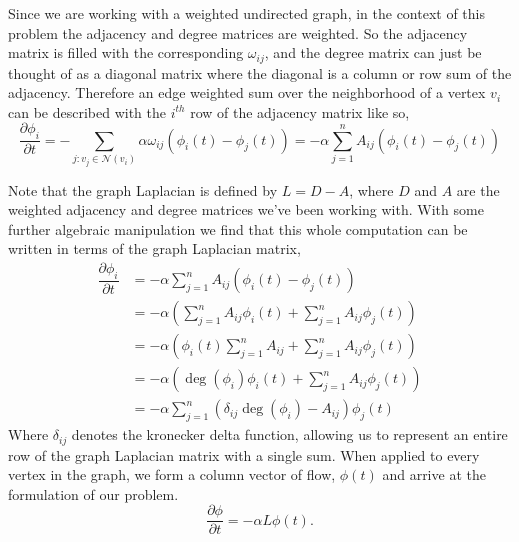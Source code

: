 \documentclass[11pt]{article}
\begin{document}
Since we are working with a weighted undirected graph, in the context of this problem the adjacency and degree matrices are weighted. So the adjacency matrix
is filled with the corresponding $\omega_{ij}$, and the degree matrix can just be thought of as a diagonal matrix where the diagonal is a column or row sum of the adjacency.  
Therefore an edge weighted sum over the neighborhood of a vertex $v_i$ can be described with the $i^{th}$ row of the adjacency matrix like so, 
\begin{equation*}
    \dfrac{\partial \phi_{i}}{\partial t} = -\sum_{j: v_j \in \mathcal{N}(v_i)} \alpha \omega_{ij}(\phi_i(t) - \phi_j(t)) =  -\alpha \sum_{j = 1}^n A_{ij}(\phi_i(t) - \phi_j(t))
\end{equation*} 


Note that the graph Laplacian is defined by $L = D - A$, where $D$ and $A$ are the weighted adjacency and degree matrices we've been working with.\cite{spielman}
With some further algebraic manipulation we find that this whole computation can be written in terms of the graph Laplacian matrix, 
\begin{align*}
    \dfrac{\partial \phi_{i}}{\partial t} &= -\alpha \sum_{j = 1}^n A_{ij}(\phi_i(t) - \phi_j(t))\\
    &= -\alpha \left(\sum_{j = 1}^n A_{ij}\phi_i(t) + \sum_{j = 1}^n A_{ij} \phi_j(t)\right)\\
    &= -\alpha \left(\phi_i(t) \sum_{j = 1}^n A_{ij} + \sum_{j = 1}^n A_{ij} \phi_j(t)\right)\\
    &= -\alpha \left(\deg(\phi_i)\phi_i(t) + \sum_{j = 1}^n A_{ij} \phi_j(t)\right)\\
    &= -\alpha \sum_{j = 1}^n (\delta_{ij}\deg(\phi_i) - A_{ij}) \phi_j(t)
\end{align*}
Where $\delta_{ij}$ denotes the kronecker delta function, allowing us to represent an entire row of the graph Laplacian matrix with a single sum. 
When applied to every vertex in the graph, we form a column vector of flow, $\phi(t)$ and arrive at the formulation of our problem.\cite{Simon}
\begin{equation*}
    \dfrac{\partial \phi}{\partial t} = -\alpha L \phi(t).
\end{equation*}
\end{document}
